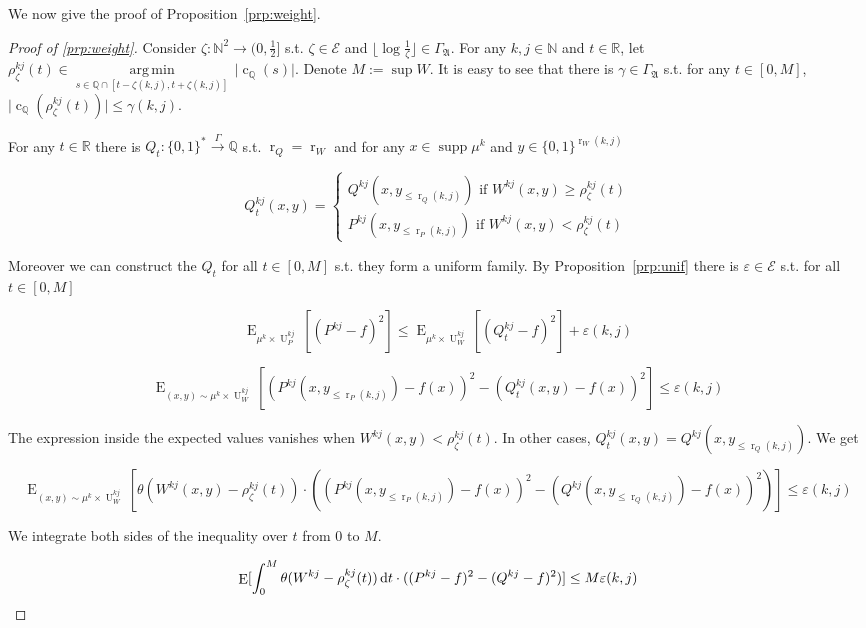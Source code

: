 \documentclass{article}
\numberwithin{equation}{section}
\theoremstyle{definition}
\theoremstyle{plain}
\newcommand{\Bool}{\{0,1\}}
\newcommand{\Words}{{\Bool^*}}
\newcommand{\WordsLen}[1]{{\Bool^{#1}}}
\DeclareMathOperator{\Supp}{supp}
\DeclareMathOperator{\E}{E}
\DeclareMathOperator{\R}{r}
\DeclareMathOperator{\U}{U}
\DeclareMathOperator{\En}{c}
\newcommand{\Argmin}[1]{\underset{#1}{\operatorname{arg\,min}}\,}
\newcommand{\Nats}{\mathbb{N}}
\newcommand{\Rats}{\mathbb{Q}}
\newcommand{\Reals}{\mathbb{R}}
\newcommand{\Abs}[1]{\lvert #1 \rvert}
\newcommand{\Floor}[1]{\lfloor #1 \rfloor}
\newcommand{\GrowA}{\Gamma_{\mathfrak{A}}}
\newcommand{\Fall}{\mathcal{E}}
\newcommand{\Scheme}{\xrightarrow{\Gamma}}
\begin{document}
We now give the proof of Proposition~\ref{prp:weight}.

\begin{proof}[Proof of \ref{prp:weight}]

Consider $\zeta: \Nats^2 \rightarrow (0,\frac{1}{2}]$ s.t.  $\zeta \in \Fall$ and $\Floor{\log \frac{1}{\zeta}} \in \GrowA$. For any $k,j \in \Nats$ and $t \in \Reals$, let $\rho_\zeta^{kj}(t) \in \Argmin{s \in \Rats \cap [t-\zeta(k,j),t+\zeta(k,j)]} \Abs{\En_\Rats(s)}$. Denote $M:= \sup W$. It is easy to see that there is $\gamma \in \GrowA$ s.t. for any $t \in [0, M]$, ${\Abs{\En_\Rats(\rho_\zeta^{kj}(t))} \leq \gamma(k,j)}$.

For any $t \in \Reals$ there is $Q_t: \Words \Scheme \Rats$ s.t. $\R_Q=\R_W$ and for any $x \in \Supp \mu^k$ and ${y \in \WordsLen{\R_W(k,j)}}$

$$Q_t^{kj}(x,y)=\begin{cases}Q^{kj}(x,y_{\leq \R_Q(k,j)}) \text{ if } W^{kj}(x,y) \geq \rho^{kj}_\zeta(t) \\ P^{kj}(x,y_{\leq \R_P(k,j)}) \text{ if } W^{kj}(x,y) < \rho^{kj}_\zeta(t)\end{cases}$$

Moreover we can construct the $Q_t$ for all $t \in [0, M]$ s.t. they form a uniform family. By Proposition~\ref{prp:unif} there is $\varepsilon \in \Fall$ s.t. for all $t \in [0, M]$

$$\E_{\mu^k \times \U_P^{kj}}[(P^{kj}-f)^2] \leq \E_{\mu^k \times \U_W^{kj}}[(Q_t^{kj}-f)^2] + \varepsilon(k,j)$$

$$\E_{(x,y) \sim \mu^k \times \U_W^{kj}}[(P^{kj}(x,y_{\leq \R_P(k,j)})-f(x))^2-(Q_t^{kj}(x,y)-f(x))^2] \leq \varepsilon(k,j)$$

The expression inside the expected values vanishes when $W^{kj}(x,y) < \rho^{kj}_\zeta(t)$. In other cases, $Q_t^{kj}(x,y) = Q^{kj}(x,y_{\leq \R_Q(k,j)})$. We get

$$\E_{(x,y) \sim \mu^k \times \U_W^{kj}}[\theta(W^{kj}(x,y)-\rho_\zeta^{kj}(t)) \cdot ((P^{kj}(x,y_{\leq \R_P(k,j)})-f(x))^2-(Q^{kj}(x,y_{\leq \R_Q(k,j)})-f(x))^2)] \leq \varepsilon(k,j)$$

We integrate both sides of the inequality over $t$ from 0 to $M$.

\begin{equation}
\label{eqn:prp__weight__prf1}
\E[\int_0^M\theta(W^{kj}-\rho_\zeta^{kj}(t)) \dif t \cdot ((P^{kj}-f)^2-(Q^{kj}-f)^2)] \leq M \varepsilon(k,j)
\end{equation}


\end{proof}
\end{document}
